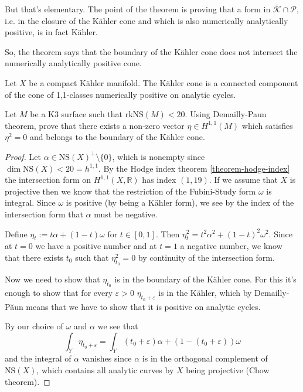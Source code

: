 But that's elementary.
The point of the theorem is proving that
a form in $\overline{\mathcal{K}}\cap
\mathcal{P}$,
i.e. in the closure of the Kähler cone
and which is also numerically analytically
positive,
is in fact Kähler.

So, the theorem says that the boundary of the
Kähler cone does
not intersect the numerically analytically
positive cone.

\begin{theorem}[Demailly-Pa\u un]
\label{theorem-demailly-paun}
Let $X$ be a compact Kähler manifold.
The Kähler cone is a connected component
of the cone of 1,1-classes numerically
positive on
analytic cycles.
\end{theorem}

\begin{exercise}
\label{exercise-demailly-paun}
Let $M$ be a K3 surface such that
$\text{rk}\text{NS}(M)<20$.
Using Demailly-Paun theorem,
prove that there exists a non-zero vector
$\eta \in H^{1,1}(M)$ which satisfies
$\eta^2=0$
and belongs to the boundary of the Kähler
cone.
\end{exercise}

\begin{proof}
Let $\alpha \in
\text{NS}(X)^{\perp}\setminus\{0\}$,
which is nonempty since $\dim
\text{NS}(X)<20=h^{1,1}$.
By the Hodge index theorem
\ref{theorem-hodge-index}
the intersection form on
$H^{1,1}(X,\mathbb{R})$
has index $(1,19)$.
If we assume that $X$ is projective
then we know that the restriction of
the Fubini-Study form $\omega$ is integral.
Since $\omega$ is positive (by being a Kähler
form),
we see by the index of the intersection form
that $\alpha$ must be negative.

Define $\eta_t:=t\alpha+(1-t)\omega$ for
$t\in[0,1]$.
Then $\eta_t^2=t^2\alpha^2+(1-t)^2\omega^2$.
Since at $t=0$ we have a positive number
and at  $t=1$ a negative number,
we know that there exists  $t_0$
such that $\eta_{t_0}^2=0$
by continuity of the intersection form.

Now we need to show that $\eta_{t_0}$ is
in the boundary of the Kähler cone.
For this it's enough to show that for every
$\varepsilon>0$
$\eta_{t_0+\varepsilon}$ is in the Kähler,
which
by Demailly-P\u aun
means that we have to show
that it is positive on analytic cycles.

By our choice of $\omega$ and $\alpha$
we see that
$$
\int_Y \eta_{t_0+\varepsilon}
=\int_Y
(t_0+\varepsilon)\alpha+(1-(t_0+\varepsilon))
\omega
$$
and the integral of $\alpha$ vanishes
since $\alpha$ is in the orthogonal
complement
of $\text{NS}(X)$, which contains
all analytic curves by $X$ being projective
(Chow theorem).
\end{proof}






